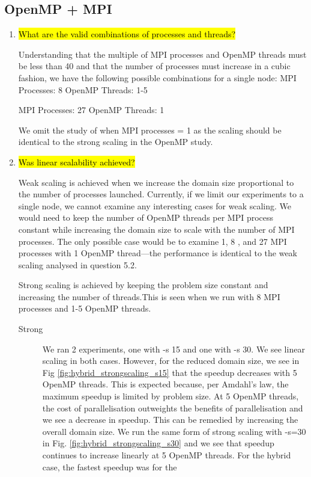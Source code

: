 \documentclass{article}
\begin{document}
\subsection{OpenMP + MPI}
\begin{enumerate}
	\item \hl{What are the valid combinations of processes and threads?}

	Understanding that the multiple of MPI processes and OpenMP threads must be less than 40 and that the number of processes must increase in a cubic fashion, we have the following possible combinations for a single node:
	MPI Processes: 8
	OpenMP Threads: 1-5
	
	MPI Processes: 27
	OpenMP Threads: 1
	
	We omit the study of when MPI processes = 1 as the scaling should be identical to the strong scaling in the OpenMP study.
	
	\item \hl{Was linear scalability achieved?}
	
	Weak scaling is achieved when we increase the domain size proportional to the number of processes launched. Currently, if we limit our experiments to a single node, we cannot examine any interesting cases for weak scaling. We would need to keep the number of OpenMP threads per MPI process constant while increasing the domain size to scale with the number of MPI processes. The only possible case would be to examine 1, 8 , and 27 MPI processes with 1 OpenMP thread---the performance is identical to the weak scaling analysed in question 5.2.
	
	Strong scaling is achieved by keeping the problem size constant and increasing the number of threads.This is seen when we run with 8 MPI processes and 1-5 OpenMP threads. 
	
	\begin{description}
		\item[Strong] We ran 2 experiments, one with -s 15 and one with -s 30. We see linear scaling in both cases. However, for the reduced domain size, we see in Fig \ref{fig:hybrid_strongscaling_s15} that the speedup decreases with 5 OpenMP threads. This is expected because, per Amdahl's law, the maximum speedup is limited by problem size. At 5 OpenMP threads, the cost of parallelisation outweights the benefits of parallelisation and we see a decrease in speedup. This can be remedied by increasing the overall domain size. We run the same form of strong scaling with -s=30 in Fig. \ref{fig:hybrid_strongscaling_s30} and we see that speedup continues to increase linearly at 5 OpenMP threads. For the hybrid case, the fastest speedup was for the 
	\end{description}
		

\end{enumerate}
\end{document}
